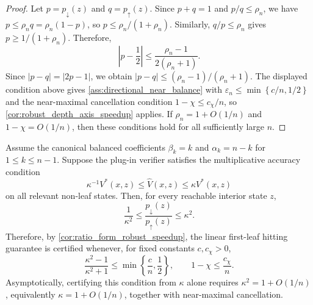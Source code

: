 \documentclass{article}
\numberwithin{theorem}{section}
\numberwithin{proposition}{section}
\numberwithin{corollary}{section}
\numberwithin{lemma}{section}
\numberwithin{conjecture}{section}
\numberwithin{remark}{section}
\numberwithin{definition}{section}
\numberwithin{assumption}{section}
\numberwithin{example}{section}
\newcommand{\mbra}[1]{\left\{#1\right\}}
\newcommand{\abs}[1]{\left| #1\right|}
\begin{document}
\begin{proof}
Let $p=p_{\downarrow}(z)$ and $q=p_{\uparrow}(z)$. Since $p+q=1$ and $p/q\le\rho_n$, we have $p\le \rho_n q=\rho_n(1-p)$, so $p\le \rho_n/(1+\rho_n)$. Similarly, $q/p\le\rho_n$ gives $p\ge1/(1+\rho_n)$. Therefore,
\begin{equation*}
    \abs{p-\frac12}\le \frac{\rho_n-1}{2(\rho_n+1)}.
\end{equation*}
Since $|p-q|=|2p-1|$, we obtain $|p-q|\le(\rho_n-1)/(\rho_n+1)$. The displayed condition above gives \cref{ass:directional_near_balance} with $\varepsilon_n\le \min\mbra{c/n,1/2}$ and the near-maximal cancellation condition $1-\chi\le c_\chi/n$, so \cref{cor:robust_depth_axis_speedup} applies. If $\rho_n=1+O(1/n)$ and $1-\chi=O(1/n)$, then these conditions hold for all sufficiently large $n$.
\end{proof}

\begin{corollary}
\label{cor:kappa_for_linear_momentum}
Assume the canonical balanced coefficients $\beta_k=k$ and $\alpha_k=n-k$ for $1\le k\le n-1$. Suppose the plug-in verifier satisfies the multiplicative accuracy condition
\begin{equation*}
    \kappa^{-1}V^*(x,z)\le \widehat V(x,z)\le \kappa V^*(x,z)
\end{equation*}
on all relevant non-leaf states. Then, for every reachable interior state $z$,
\begin{equation*}
    \frac{1}{\kappa^2}\le \frac{p_{\downarrow}(z)}{p_{\uparrow}(z)}\le \kappa^2.
\end{equation*}
Therefore, by \cref{cor:ratio_form_robust_speedup}, the linear first-leaf
hitting guarantee is certified whenever, for fixed constants $c,c_\chi>0$,
\begin{equation*}
    \frac{\kappa^2-1}{\kappa^2+1}
    \le
    \min\left\{\frac{c}{n},\frac12\right\},
    \qquad
    1-\chi\le \frac{c_\chi}{n}.
\end{equation*}
Asymptotically, certifying this condition from $\kappa$ alone requires
$\kappa^2=1+O(1/n)$, equivalently $\kappa=1+O(1/n)$, together with
near-maximal cancellation.
\end{corollary}
\end{document}

